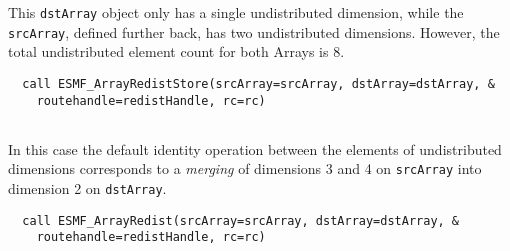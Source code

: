    This {\tt dstArray} object only has a single undistributed dimension, while
   the {\tt srcArray}, defined further back, has two undistributed dimensions.
   However, the total undistributed element count for both Arrays is 8. 

 \begin{verbatim}
  call ESMF_ArrayRedistStore(srcArray=srcArray, dstArray=dstArray, &
    routehandle=redistHandle, rc=rc)
 
\end{verbatim}
 
 

   In this case the default identity operation between the elements of
   undistributed dimensions corresponds to a {\em merging} of dimensions
   3 and 4 on {\tt srcArray} into dimension 2 on {\tt dstArray}. 

 \begin{verbatim}
  call ESMF_ArrayRedist(srcArray=srcArray, dstArray=dstArray, &
    routehandle=redistHandle, rc=rc)
 
\end{verbatim}

\setlength{\parskip}{\oldparskip}
\setlength{\parindent}{\oldparindent}
\setlength{\baselineskip}{\oldbaselineskip}
